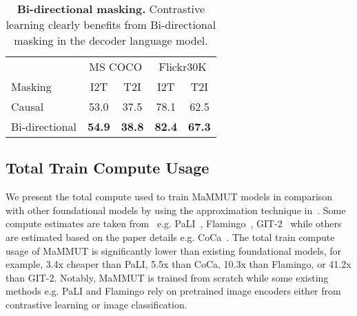 \documentclass[10pt]{article} \usepackage[accepted]{tmlr}
\newcommand{\tablestyle}[2]{\setlength{\tabcolsep}{#1}\renewcommand{\arraystretch}{#2}\centering\footnotesize}
\newcommand{\ours}{MaMMUT\xspace}
\begin{document}
\begin{table}[h]
\centering
\small
\tablestyle{8pt}{1.1}
\begin{tabular}{l|cc|cc}
& 
\multicolumn{2}{c|}{MS COCO} & \multicolumn{2}{c}{Flickr30K} \\
 Masking & I2T & T2I &I2T &T2I \\ 
\hline
 Causal  & 53.0    & 37.5  & 78.1  & 62.5    \\
 Bi-directional  & \bf{54.9}   & \bf{38.8}  & \bf{82.4}   & \bf{67.3}   \\
\hline
\end{tabular}
\vspace{2mm}
\caption{\textbf{Bi-directional masking.} Contrastive learning clearly benefits from Bi-directional masking in the decoder language model.}
\label{tab:ablation_bidir}
\vspace{-2mm}
\end{table}

\subsection{Total Train Compute Usage}
We present the total compute used to train \ours models in comparison with other foundational models by using the approximation technique in~\cite{gpt3}. Some compute estimates are taken from~\cite{pali} e.g. PaLI~\citep{pali}, Flamingo~\citep{flamingo}, GIT-2~\citep{wang2022git} while others are estimated based on the paper details e.g. CoCa~\citep{yu2022coca}. The total train compute usage of \ours is significantly lower than existing foundational models, for example, 3.4x cheaper than PaLI, 5.5x than CoCa, 10.3x than Flamingo, or 41.2x than GIT-2. Notably, \ours is trained from scratch while some existing methods e.g. PaLI and Flamingo rely on pretrained image encoders either from contrastive learning or image classification.
\end{document}
